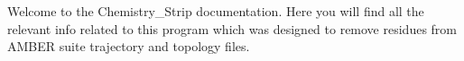 Welcome to the Chemistry\_\-Strip documentation. Here you will find all the relevant info related to this program which was designed to remove residues from AMBER suite trajectory and topology files. 